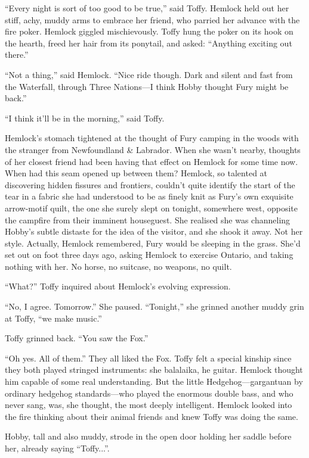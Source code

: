\documentclass[11pt,a5paper]{article}
\begin{document}
``Every night is sort of too good to be true,'' said Toffy. Hemlock held out her stiff, achy, muddy arms to embrace her friend, who parried her advance with the fire poker. Hemlock giggled mischievously. Toffy hung the poker on its hook on the hearth, freed her hair from its ponytail, and asked: ``Anything exciting out there.''

``Not a thing,'' said Hemlock. ``Nice ride though. Dark and silent and fast from the Waterfall, through Three Nations---I think Hobby thought Fury might be back.''

``I think it'll be in the morning,'' said Toffy.

Hemlock's stomach tightened at the thought of Fury camping in the woods with the stranger from Newfoundland \& Labrador. When she wasn't nearby, thoughts of her closest friend had been having that effect on Hemlock for some time now. When had this seam opened up between them? Hemlock, so talented at discovering hidden fissures and frontiers, couldn't quite identify the start of the tear in a fabric she had understood to be as finely knit as Fury's own exquisite arrow-motif quilt, the one she surely slept on tonight, somewhere west, opposite the campfire from their imminent houseguest. She realised she was channeling Hobby's subtle distaste for the idea of the visitor, and she shook it away. Not her style. Actually, Hemlock remembered, Fury would be sleeping in the grass. She'd set out on foot three days ago, asking Hemlock to exercise Ontario, and taking nothing with her. No horse, no suitcase, no weapons, no quilt.

``What?'' Toffy inquired about Hemlock's evolving expression.

``No, I agree. Tomorrow.'' She paused. ``Tonight,'' she grinned another muddy grin at Toffy, ``we make music.''

Toffy grinned back. ``You saw the Fox.''

``Oh yes. All of them.'' They all liked the Fox. Toffy felt a special kinship since they both played stringed instruments: she balalaika, he guitar. Hemlock thought him capable of some real understanding. But the little Hedgehog---gargantuan by ordinary hedgehog standards---who played the enormous double bass, and who never sang, was, she thought, the most deeply intelligent. Hemlock looked into the fire thinking about their animal friends and knew Toffy was doing the same.

Hobby, tall and also muddy, strode in the open door holding her saddle before her, already saying ``Toffy...''.
\end{document}
